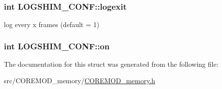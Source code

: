 \subsubsection[{logexit}]{\setlength{\rightskip}{0pt plus 5cm}int L\+O\+G\+S\+H\+I\+M\+\_\+\+C\+O\+N\+F\+::logexit}\label{structLOGSHIM__CONF_ade9849e9a2d4a6973b891d0ba46724ed}


log every x frames (default = 1) 

\hypertarget{structLOGSHIM__CONF_a399b782abca4a24ae8e5a3c11ac9bc48}{}
\subsubsection[{on}]{\setlength{\rightskip}{0pt plus 5cm}int L\+O\+G\+S\+H\+I\+M\+\_\+\+C\+O\+N\+F\+::on}\label{structLOGSHIM__CONF_a399b782abca4a24ae8e5a3c11ac9bc48}


The documentation for this struct was generated from the following file\+:\begin{DoxyCompactItemize}
\item 
src/\+C\+O\+R\+E\+M\+O\+D\+\_\+memory/\hyperlink{COREMOD__memory_8h}{C\+O\+R\+E\+M\+O\+D\+\_\+memory.\+h}\end{DoxyCompactItemize}
